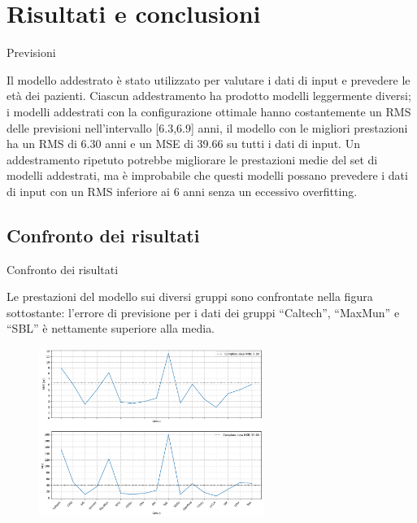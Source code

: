 \documentclass{beamer}
\begin{document}

\section{Risultati e conclusioni}
\begin{frame}{Previsioni}

	Il modello addestrato è stato utilizzato per valutare i dati di input e prevedere le età dei pazienti.
	Ciascun addestramento ha prodotto modelli leggermente diversi; i modelli addestrati con la configurazione ottimale hanno costantemente un RMS delle previsioni nell'intervallo [6.3,6.9] anni, il modello con le migliori prestazioni ha un RMS di 6.30 anni e un MSE di 39.66 su tutti i dati di input.
\pause
	Un addestramento ripetuto potrebbe migliorare le prestazioni medie del set di modelli addestrati, ma è improbabile che questi modelli possano prevedere i dati di input con un RMS inferiore ai 6 anni senza un eccessivo overfitting.

\end{frame}



\subsection{Confronto dei risultati}
\begin{frame}{Confronto dei risultati}

	Le prestazioni del modello sui diversi gruppi sono confrontate nella figura sottostante: 
l'errore di previsione per i dati dei gruppi ``Caltech'', ``MaxMun'' e ``SBL'' è nettamente superiore alla media.

	\begin{figure}
		\includegraphics[width=0.65\textwidth]{result_1.png}
		\label{plotRMSComparison2}
	\end{figure}

\end{frame}
\end{document}
